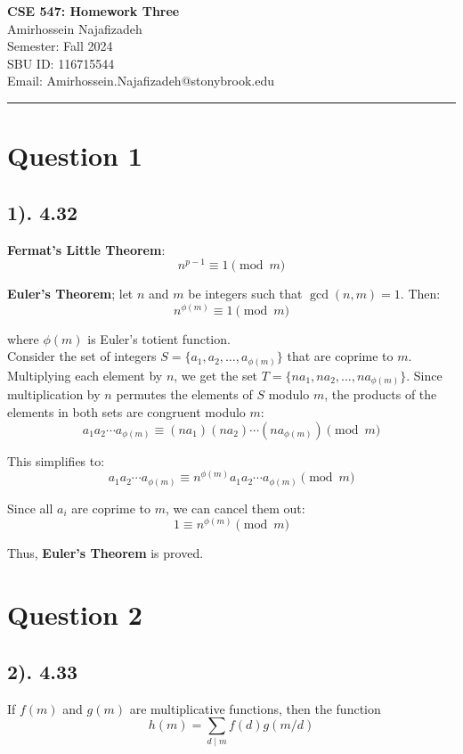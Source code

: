 \documentclass[12pt]{article}
\begin{document}
\begin{center}
    {\LARGE\textbf{CSE 547: Homework Three}} \\[1em]
    {\large Amirhossein Najafizadeh} \\[1em]
    Semester: Fall 2024 \\ 
    SBU ID: 116715544 \\
    Email: Amirhossein.Najafizadeh@stonybrook.edu \\[1em]
    \noindent\rule{\textwidth}{0.6pt}
\end{center}

\section*{Question 1}
\subsection*{1). 4.32}
\textbf{Fermat's Little Theorem}:
\[
    n^{p-1} \equiv 1 \pmod{m}
\]

\textbf{Euler's Theorem}; let \( n \) and \( m \) be integers such that \(\gcd(n, m) = 1\). Then:
\[ 
    n^{\phi(m)} \equiv 1 \pmod{m}
\]

where \(\phi(m)\) is Euler's totient function. \\

Consider the set of integers \( S = \{ a_1, a_2, \ldots, a_{\phi(m)} \} \) that are coprime to \( m \).
Multiplying each element by \( n \), we get the set \( T = \{ na_1, na_2, \ldots, na_{\phi(m)} \} \).
Since multiplication by \( n \) permutes the elements of \( S \) modulo \( m \), the products of the elements in both sets are congruent modulo \( m \):
\[ 
    a_1 a_2 \cdots a_{\phi(m)} \equiv (na_1)(na_2)\cdots(na_{\phi(m)}) \pmod{m} 
\]

This simplifies to:
\[ 
    a_1 a_2 \cdots a_{\phi(m)} \equiv n^{\phi(m)} a_1 a_2 \cdots a_{\phi(m)} \pmod{m}
\]

Since all \( a_i \) are coprime to \( m \), we can cancel them out:
\[ 
    1 \equiv n^{\phi(m)} \pmod{m}
\]

Thus, \textbf{Euler's Theorem} is proved.    

\section*{Question 2}
\subsection*{2). 4.33}
If \( f(m) \) and \( g(m) \) are multiplicative functions, then the function
\[ 
    h(m) = \sum_{d \mid m} f(d) g(m/d)
\]
\end{document}
